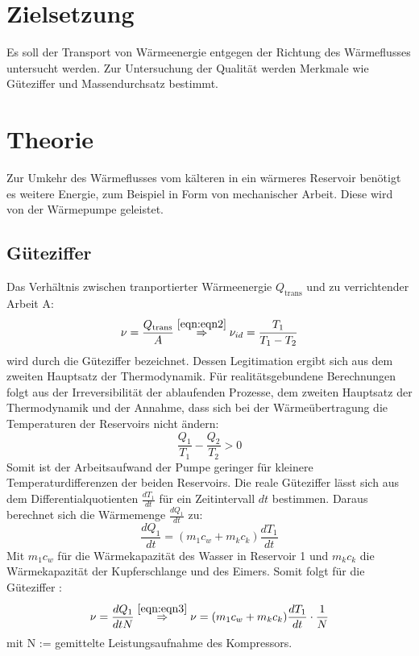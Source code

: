 \section{Zielsetzung}
\label{sec:Ziel}
Es soll der Transport von Wärmeenergie entgegen der Richtung des Wärmeflusses untersucht werden.
Zur Untersuchung der Qualität werden Merkmale wie Güteziffer und Massendurchsatz bestimmt.

\section{Theorie}
\label{sec:Theorie}
Zur Umkehr des Wärmeflusses vom kälteren in ein wärmeres Reservoir benötigt es weitere Energie, zum Beispiel in Form von mechanischer Arbeit.
Diese wird von der Wärmepumpe geleistet.

\subsection{Güteziffer}
\label{sec:Güteziffer}
Das Verhältnis zwischen tranportierter Wärmeenergie $Q_\text{trans}$ und zu verrichtender Arbeit A:
\begin{equation}
  \nu = \frac{Q_\text{trans}}{A} \stackrel{\ref{eqn:eqn2}}\Rightarrow \nu_{id} = \frac{T_1}{T_1-T_2}
  \label{eqn:eqn1}
\end{equation}
wird durch die Güteziffer \nu bezeichnet.
Dessen Legitimation ergibt sich aus dem zweiten Hauptsatz der Thermodynamik.
Für realitätsgebundene Berechnungen folgt aus der Irreversibilität der ablaufenden Prozesse,
dem zweiten Hauptsatz der Thermodynamik und der Annahme, dass sich bei der Wärmeübertragung die Temperaturen der Reservoirs nicht ändern:
\begin{equation}
  \frac{Q_1}{T_1} - \frac{Q_2}{T_2} > 0
  \label{eqn:eqn2}
\end{equation}
Somit ist der Arbeitsaufwand der Pumpe geringer für kleinere Temperaturdifferenzen der beiden Reservoirs.
Die reale Güteziffer \nu lässt sich aus dem Differentialquotienten $\frac{dT_1}{dt}$ für ein Zeitintervall $dt$ bestimmen.
Daraus berechnet sich die Wärmemenge $\frac{dQ_1}{dt}$ zu:
\begin{equation}
  \frac{dQ_1}{dt} = (m_1c_w + m_kc_k) \frac{dT_1}{dt}
  \label{eqn:eqn3}
\end{equation}
Mit $m_1c_w$ für die Wärmekapazität des Wasser in Reservoir 1 und $m_kc_k$ die Wärmekapazität der Kupferschlange und des Eimers.
Somit folgt für die Güteziffer \nu :
\begin{equation}
  \nu = \frac{dQ_1}{dtN} \stackrel{\ref{eqn:eqn3}}\Rightarrow \nu = (m_1c_w + m_kc_k) \frac{dT_1}{dt} \cdot \frac{1}{N}
  \label{eqn:eqn4}
\end{equation}
mit N := gemittelte Leistungsaufnahme des Kompressors.


